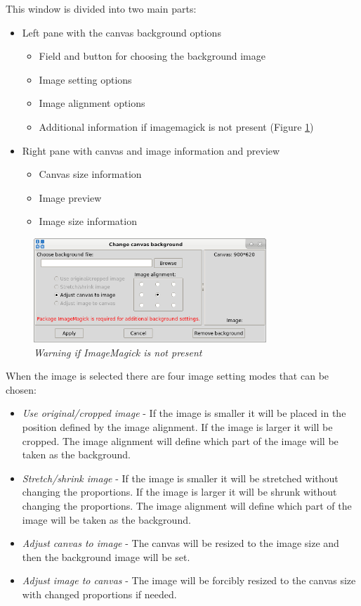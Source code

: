 This window is divided into two main parts:
\begin{itemize}
    \item Left pane with the canvas background options
    \begin{itemize}
	\item Field and button for choosing the background image
	\item Image setting options
	\item Image alignment options
	\item Additional information if imagemagick is not present (Figure
\ref{fig:imagemagick_warning})
    \end{itemize}
    \item Right pane with canvas and image information and preview
    \begin{itemize}
	\item Canvas size information
	\item Image preview
	\item Image size information
    \end{itemize}
\end{itemize}

\begin{figure}[H]
	\centering
	\vspace{10pt}
	\includegraphics[width=0.78\textwidth]{./images/imagemagick_warning.png}
	\caption{\emph{Warning if ImageMagick is not present}}
	\label{fig:imagemagick_warning}
\end{figure}


When the image is selected there are four image setting modes that can be chosen:
\begin{itemize}
    \item \emph{Use original/cropped image} - If the image is smaller it will
be placed in the position defined by the image alignment. If the image is
larger  it will be cropped. The image alignment will define which part of the
image will be taken as the background.
    \item \emph{Stretch/shrink image} - If the image is smaller it will be
stretched without changing the proportions. If the image is larger it will be
shrunk without changing the proportions. The image alignment will define which
part of the image will be taken as the background.
    \item \emph{Adjust canvas to image} - The canvas will be resized to the
image size and then the background image will be set.
    \item \emph{Adjust image to canvas} - The image will be forcibly resized to
the canvas size with changed proportions if needed.
\end{itemize}

